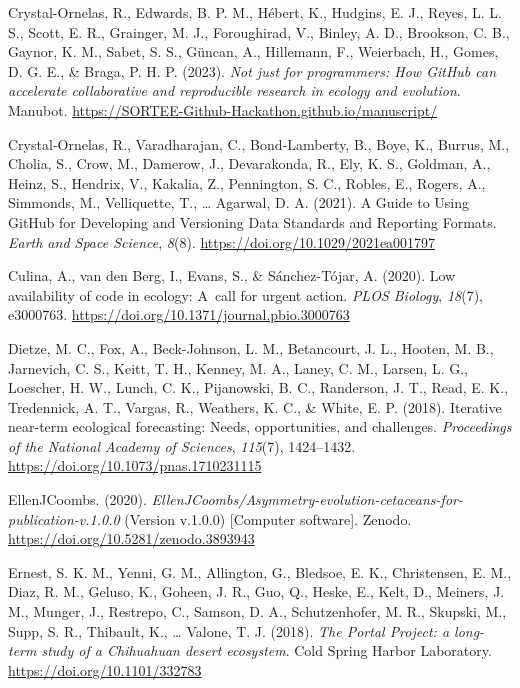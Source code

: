 \begin{CSLReferences}{1}{0}
\leavevmode{}%
Crystal-Ornelas, R., Edwards, B. P. M., Hébert, K., Hudgins, E. J., Reyes, L. L. S., Scott, E. R., Grainger, M. J., Foroughirad, V., Binley, A. D., Brookson, C. B., Gaynor, K. M., Sabet, S. S., Güncan, A., Hillemann, F., Weierbach, H., Gomes, D. G. E., \& Braga, P. H. P. (2023). \emph{Not just for programmers: How GitHub can accelerate collaborative and reproducible research in ecology and evolution}. Manubot. \url{https://SORTEE-Github-Hackathon.github.io/manuscript/}

\leavevmode{}%
Crystal‐Ornelas, R., Varadharajan, C., Bond‐Lamberty, B., Boye, K., Burrus, M., Cholia, S., Crow, M., Damerow, J., Devarakonda, R., Ely, K. S., Goldman, A., Heinz, S., Hendrix, V., Kakalia, Z., Pennington, S. C., Robles, E., Rogers, A., Simmonds, M., Velliquette, T., \ldots{} Agarwal, D. A. (2021). A Guide to Using GitHub for Developing and Versioning Data Standards and Reporting Formats. \emph{Earth and Space Science}, \emph{8}(8). \url{https://doi.org/10.1029/2021ea001797}

\leavevmode{}%
Culina, A., van den Berg, I., Evans, S., \& Sánchez-Tójar, A. (2020). Low availability of code in ecology: A~call for urgent action. \emph{PLOS Biology}, \emph{18}(7), e3000763. \url{https://doi.org/10.1371/journal.pbio.3000763}

\leavevmode{}%
Dietze, M. C., Fox, A., Beck-Johnson, L. M., Betancourt, J. L., Hooten, M. B., Jarnevich, C. S., Keitt, T. H., Kenney, M. A., Laney, C. M., Larsen, L. G., Loescher, H. W., Lunch, C. K., Pijanowski, B. C., Randerson, J. T., Read, E. K., Tredennick, A. T., Vargas, R., Weathers, K. C., \& White, E. P. (2018). Iterative near-term ecological forecasting: Needs, opportunities, and challenges. \emph{Proceedings of the National Academy of Sciences}, \emph{115}(7), 1424--1432. \url{https://doi.org/10.1073/pnas.1710231115}

\leavevmode{}%
EllenJCoombs. (2020). \emph{EllenJCoombs/Asymmetry-evolution-cetaceans-for-publication-v.1.0.0} (Version v.1.0.0) {[}Computer software{]}. Zenodo. \url{https://doi.org/10.5281/zenodo.3893943}

\leavevmode{}%
Ernest, S. K. M., Yenni, G. M., Allington, G., Bledsoe, E. K., Christensen, E. M., Diaz, R. M., Geluso, K., Goheen, J. R., Guo, Q., Heske, E., Kelt, D., Meiners, J. M., Munger, J., Restrepo, C., Samson, D. A., Schutzenhofer, M. R., Skupski, M., Supp, S. R., Thibault, K., \ldots{} Valone, T. J. (2018). \emph{The Portal Project: a long-term study of a Chihuahuan desert ecosystem}. Cold Spring Harbor Laboratory. \url{https://doi.org/10.1101/332783}


\end{CSLReferences}
